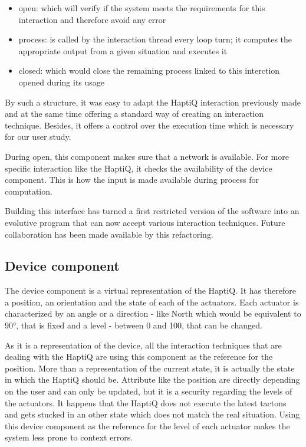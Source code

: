 \begin{itemize}
\item
  open: which will verify if the system meets the requirements for this
  interaction and therefore avoid any error
\item
  process: is called by the interaction thread every loop turn; it
  computes the appropriate output from a given situation and executes it
\item
  closed: which would close the remaining process linked to this
  interction opened during its usage
\end{itemize}

By such a structure, it was easy to adapt the HaptiQ interaction
previously made and at the same time offering a standard way of creating
an interaction technique. Besides, it offers a control over the
execution time which is necessary for our user study.

During open, this component makes sure that a network is available. For
more specific interaction like the HaptiQ, it checks the availability of
the device component. This is how the input is made available during
process for computation.

Building this interface has turned a first restricted version of the
software into an evolutive program that can now accept various
interaction techniques. Future collaboration has been made available by
this refactoring.

\subsection{Device component}\label{device-component}

The device component is a virtual representation of the HaptiQ. It has
therefore a position, an orientation and the state of each of the
actuators. Each actuator is characterized by an angle or a direction -
like North which would be equivalent to 90°, that is fixed and a level -
between 0 and 100, that can be changed.

As it is a representation of the device, all the interaction techniques
that are dealing with the HaptiQ are using this component as the
reference for the position. More than a representation of the current
state, it is actually the state in which the HaptiQ should be. Attribute
like the position are directly depending on the user and can only be
updated, but it is a security regarding the levels of the actuators. It
happens that the HaptiQ does not execute the latest tactons and gets
stucked in an other state which does not match the real situation. Using
this device component as the reference for the level of each actuator
makes the system less prone to context errors.

